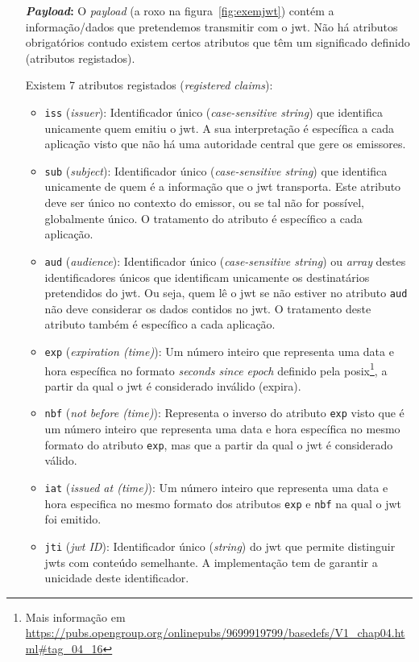 \begin{itemize}
    \item [\textbf{\textit{Payload}:}] O \textit{payload} (a roxo na figura~\ref{fig:exemjwt}) contém a informação/dados que pretendemos transmitir com o \acrshort{jwt}. Não há atributos obrigatórios contudo existem certos atributos que têm um significado definido (atributos registados).

    Existem 7 atributos registados (\textit{registered claims}):~\cite{jwthandbook}
    \begin{itemize}
        \item \texttt{iss} (\textit{issuer}): Identificador único (\textit{case-sensitive string}) que identifica unicamente quem emitiu o \acrshort{jwt}. A sua interpretação é específica a cada aplicação visto que não há uma autoridade central que gere os emissores.
        \item \texttt{sub} (\textit{subject}): Identificador único (\textit{case-sensitive string}) que identifica unicamente de quem é a informação que o \acrshort{jwt} transporta. Este atributo deve ser único no contexto do emissor, ou se tal não for possível, globalmente único. O tratamento do atributo é específico a cada aplicação. 
        \item \texttt{aud} (\textit{audience}): Identificador único (\textit{case-sensitive string}) ou \textit{array} destes identificadores únicos que identificam unicamente os destinatários pretendidos do \acrshort{jwt}. Ou seja, quem lê o \acrshort{jwt} se não estiver no atributo \texttt{aud} não deve considerar os dados contidos no \acrshort{jwt}. O tratamento deste atributo também é específico a cada aplicação. 
        \item \texttt{exp} (\textit{expiration (time)}): Um número inteiro que representa uma data e hora específica no formato \textit{seconds since epoch} definido pela \acrshort{posix}\footnote{Mais informação em \url{https://pubs.opengroup.org/onlinepubs/9699919799/basedefs/V1\_chap04.html\#tag\_04\_16}}, a partir da qual o \acrshort{jwt} é considerado inválido (expira).
        \item \texttt{nbf} (\textit{not before (time)}): Representa o inverso do atributo \texttt{exp} visto que é um número inteiro que representa uma data e hora específica no mesmo formato do atributo \texttt{exp}, mas que a partir da qual o \acrshort{jwt} é considerado válido.
        \item \texttt{iat} (\textit{issued at (time)}): Um número inteiro que representa uma data e hora especifica no mesmo formato dos atributos \texttt{exp} e \texttt{nbf} na qual o \acrshort{jwt} foi emitido.
        \item \texttt{jti} (\textit{\acrshort{jwt} ID}): Identificador único (\textit{string}) do \acrshort{jwt} que permite distinguir \acrshort{jwt}s com conteúdo semelhante. A implementação tem de garantir a unicidade deste identificador.
    \end{itemize}


\end{itemize}
